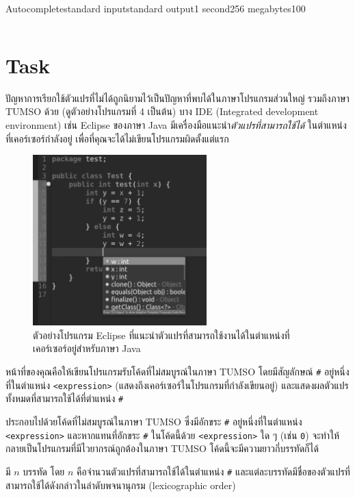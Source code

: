 \documentclass[11pt,a4paper]{article}
\begin{document}
\begin{problem}{Autocomplete}{standard input}{standard output}{1 second}{256 megabytes}{100}
\begin{tabular}{|M{12cm}|M{3.5cm}|N}
  \end{tabular}

\section*{Task}

  ปัญหาการเรียกใช้ตัวแปรที่ไม่ได้ถูกนิยามไว้เป็นปัญหาที่พบได้ในภาษาโปรแกรมส่วนใหญ่ รวมถึงภาษา TUMSO ด้วย (ดูตัวอย่างโปรแกรมที่ 4 เป็นต้น) บาง IDE (Integrated development environment) เช่น Eclipse ของภาษา Java มีเครื่องมือแนะนำ\textit{ตัวแปรที่สามารถใช้ได้} ในตำแหน่งที่เคอร์เซอร์กำลังอยู่ เพื่อที่คุณจะได้ไม่เขียนโปรแกรมผิดตั้งแต่แรก

  \begin{figure}[h]
    \centering
    \includegraphics[width=0.6\textwidth]{calc-vars}
    \caption{ตัวอย่างโปรแกรม Eclipse ที่แนะนำตัวแปรที่สามารถใช้งานได้ในตำแหน่งที่เคอร์เซอร์อยู่สำหรับภาษา Java }
  \end{figure}

  หน้าที่ของคุณคือให้เขียนโปรแกรมรับโค้ดที่ไม่สมบูรณ์ในภาษา TUMSO โดยมีสัญลักษณ์ \texttt{\#} อยู่หนึ่งที่ในตำแหน่ง \texttt{<expression>} (แสดงถึงเคอร์เซอร์ในโปรแกรมที่กำลังเขียนอยู่) และแสดงผลตัวแปรทั้งหมดที่สามารถใช้ได้ที่ตำแหน่ง \texttt{\#}

\InputFile

  ประกอบไปด้วยโค้ดที่ไม่สมบูรณ์ในภาษา TUMSO ซึ่งมีอักขระ \texttt{\#} อยู่หนึ่งที่ในตำแหน่ง \texttt{<expression>} และหากแทนที่อักขระ \texttt{\#} ในโค้ดนี้ด้วย \texttt{<expression>} ใด ๆ (เช่น \texttt{0}) จะทำให้กลายเป็นโปรแกรมที่มีไวยากรณ์ถูกต้องในภาษา TUMSO โค้ดนี้จะมีความยาวกี่บรรทัดก็ได้

\OutputFile

  มี $n$ บรรทัด โดย $n$ คือจำนวนตัวแปรที่สามารถใช้ได้ในตำแหน่ง \texttt{\#} และแต่ละบรรทัดมีชื่อของตัวแปรที่สามารถใช้ได้ดังกล่าวในลำดับพจนานุกรม (lexicographic order)


\end{problem}
\end{document}
